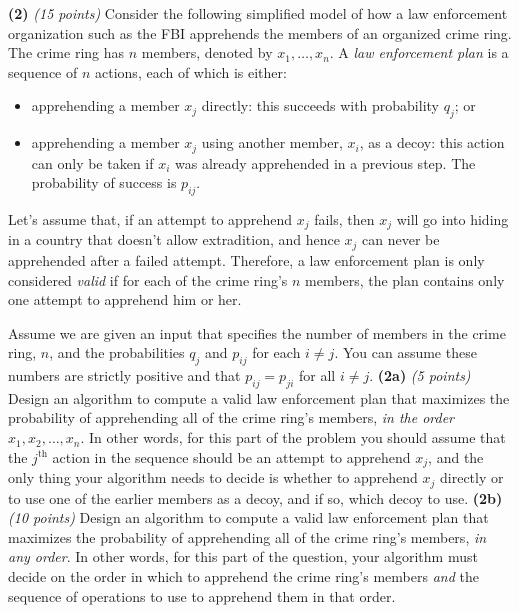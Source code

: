 \documentclass[12pt]{article}
\def\gap{0.1in}
\def\bigap{0.25in}
\begin{document}
\setlength{\parindent}{0in}
\addtolength{\parskip}{0.1cm}
\setlength{\fboxrule}{.5mm}\setlength{\fboxsep}{1.2mm}
\newlength{\boxlength}\setlength{\boxlength}{\textwidth}
\addtolength{\boxlength}{-4mm}
\begin{center}
\end{center}
\vspace{5mm}

\vskip \bigap
{\bf (2)} {\em (15 points)}
  Consider the following simplified model of how a law enforcement
  organization such as the FBI apprehends the members of an
  organized crime ring. The crime ring has $n$ members, denoted by
  $x_1,\ldots,x_n$. A {\em law enforcement plan} is a sequence of
  $n$ actions, each of which is either:
  \begin{itemize}
    \item
      apprehending a member $x_j$ directly: this succeeds with
      probability $q_j$; or
    \item
      apprehending a member $x_j$ using another member, $x_i$, as a decoy:
      this action can only be taken if $x_i$ was already apprehended in a
      previous step. The probability of success is $p_{ij}$.
  \end{itemize}
  Let's assume that, if an attempt to apprehend $x_j$ fails, then $x_j$
  will go into hiding in a country that doesn't allow extradition, and
  hence $x_j$ can never be apprehended after a failed attempt.
  Therefore, a law enforcement plan is only considered {\em valid} if
  for each of the crime ring's $n$ members, the plan contains only one
  attempt to apprehend him or her.

  Assume we are given an input that specifies the number of members
  in the crime ring, $n$, and the probabilities $q_j$ and $p_{ij}$
  for each $i \ne j$. You can assume these numbers are strictly
  positive and that $p_{ij} = p_{ji}$  for all $i \ne j$.
  \vskip \gap
{\bf (2a)} {\em (5 points)}
  Design an algorithm to compute a valid law enforcement plan
  that maximizes the probability of apprehending all of the
  crime ring's members, {\em in the order $x_1,x_2,\ldots,x_n$}.
  In other words, for this part of the problem you should assume
  that the $j^{\mathrm{th}}$ action in the sequence should be
  an attempt to apprehend $x_j$, and the only thing your algorithm
  needs to decide is whether to apprehend $x_j$ directly or to use
  one of the earlier members as a decoy, and if so, which decoy to
  use.
  \vskip \gap
{\bf (2b)} {\em (10 points)}
  Design an algorithm to compute a valid law enforcement plan
  that maximizes the probability of apprehending all of the
  crime ring's members, {\em in any order}. In other words,
  for this part of the question, your algorithm must decide
  on the order in which to apprehend the crime ring's members
  {\em and} the sequence of operations to use to apprehend
  them in that order.

\vskip \bigap

\end{document}
